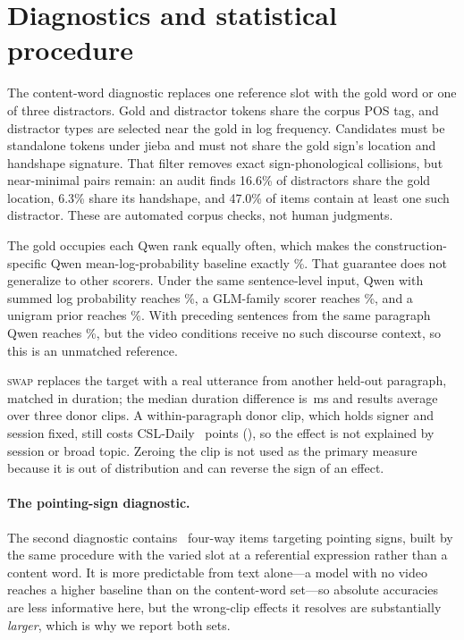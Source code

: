\documentclass[11pt]{article}
\begin{document}


\appendix

\section{Diagnostics and statistical procedure}
\label{sec:diag}

The content-word diagnostic replaces one reference slot with the gold word or one
of three distractors. Gold and distractor tokens share the corpus POS tag, and
distractor types are selected near the gold in log frequency. Candidates must be
standalone tokens under jieba and must not share the gold sign's location and
handshape signature. That filter removes exact sign-phonological collisions, but
near-minimal pairs remain: an audit finds 16.6\% of distractors share the gold
location, 6.3\% share its handshape, and 47.0\% of items contain at least one
such distractor. These are automated corpus checks, not human judgments.

The gold occupies each Qwen rank equally often, which makes the
construction-specific Qwen mean-log-probability baseline exactly \ChanceLevel\%.
That guarantee does not generalize to other scorers. Under the same
sentence-level input, Qwen with summed log probability reaches \LexLMpriorSum\%,
a GLM-family scorer \citep{glm4} reaches \LexLMtwoPrior\%, and a unigram prior
reaches \LexMajority\%. With preceding sentences from the same paragraph Qwen
reaches \LexLMcontext\%, but the video conditions receive no such discourse
context, so this is an unmatched reference.

\textsc{swap} replaces the target with a real utterance from another held-out
paragraph, matched in duration; the median duration difference is
\LexSwapDurMedian\,ms and results average over three donor clips. A
within-paragraph donor clip, which holds signer and session fixed, still costs
CSL-Daily \CsldailyLexWithinDeltaAbs\ points (\CsldailyWithinCI), so the effect is
not explained by session or broad topic. Zeroing the clip is not used as the
primary measure because it is out of distribution and can reverse the sign of an
effect.

\paragraph{The pointing-sign diagnostic.}
The second diagnostic contains \ItemsN\ four-way items targeting pointing signs,
built by the same procedure with the varied slot at a referential expression
rather than a content word. It is more predictable from text alone---a model with
no video reaches a higher baseline than on the content-word set---so absolute
accuracies are less informative here, but the wrong-clip effects it resolves are
substantially \emph{larger}, which is why we report both sets.
\end{document}
